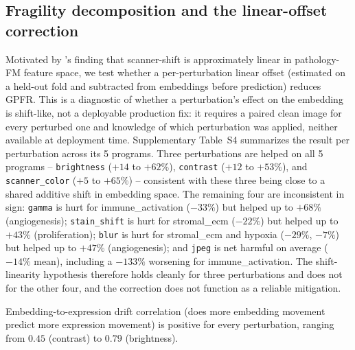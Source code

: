 \documentclass[11pt]{article}
\begin{document}
\subsection{Fragility decomposition and the linear-offset correction}
\label{sec:fragility_decomposition}
Motivated by \citet{robustifying_fms_2607}'s finding that scanner-shift is approximately linear in pathology-FM feature space, we test whether a per-perturbation linear offset (estimated on a held-out fold and subtracted from embeddings before prediction) reduces GPFR. This is a diagnostic of whether a perturbation's effect on the embedding is shift-like, not a deployable production fix: it requires a paired clean image for every perturbed one and knowledge of which perturbation was applied, neither available at deployment time. Supplementary Table~S4 summarizes the result per perturbation across its 5 programs. Three perturbations are helped on all 5 programs -- \texttt{brightness} ($+14$ to $+62\%$), \texttt{contrast} ($+12$ to $+53\%$), and \texttt{scanner\_color} ($+5$ to $+65\%$) -- consistent with these three being close to a shared additive shift in embedding space. The remaining four are inconsistent in sign: \texttt{gamma} is hurt for immune\_activation ($-33\%$) but helped up to $+68\%$ (angiogenesis); \texttt{stain\_shift} is hurt for stromal\_ecm ($-22\%$) but helped up to $+43\%$ (proliferation); \texttt{blur} is hurt for stromal\_ecm and hypoxia ($-29\%$, $-7\%$) but helped up to $+47\%$ (angiogenesis); and \texttt{jpeg} is net harmful on average ($-14\%$ mean), including a $-133\%$ worsening for immune\_activation. The shift-linearity hypothesis therefore holds cleanly for three perturbations and does not for the other four, and the correction does not function as a reliable mitigation.

Embedding-to-expression drift correlation (does more embedding movement predict more expression movement) is positive for every perturbation, ranging from $0.45$ (contrast) to $0.79$ (brightness).
\end{document}
